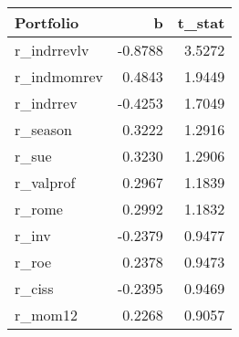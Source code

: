 \begin{tabular}{lrr}
\toprule
Portfolio & b & t_stat \\
\midrule
r_indrrevlv & -0.8788 & 3.5272 \\
r_indmomrev & 0.4843 & 1.9449 \\
r_indrrev & -0.4253 & 1.7049 \\
r_season & 0.3222 & 1.2916 \\
r_sue & 0.3230 & 1.2906 \\
r_valprof & 0.2967 & 1.1839 \\
r_rome & 0.2992 & 1.1832 \\
r_inv & -0.2379 & 0.9477 \\
r_roe & 0.2378 & 0.9473 \\
r_ciss & -0.2395 & 0.9469 \\
r_mom12 & 0.2268 & 0.9057 \\
\bottomrule
\end{tabular}
